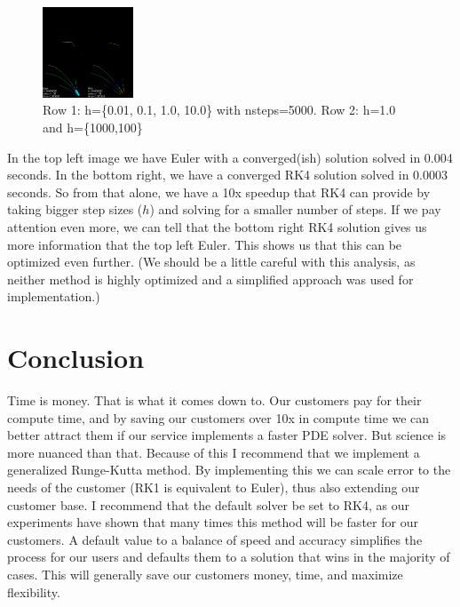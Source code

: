 \documentclass[12pt,letter]{article}
\begin{document}
\begin{figure}[ht]
\begin{center}
    \includegraphics[width=0.24\textwidth]{imgs/h10n100.png}
    \end{center}
    \caption{Row 1: h=\{0.01, 0.1, 1.0, 10.0\} with nsteps=5000. Row 2: h=1.0 and h=\{1000,100\}}
\end{figure}
\FloatBarrier

In the top left image we have Euler with a converged(ish) solution solved in
0.004 seconds. In the bottom right, we have a converged RK4 solution solved in
0.0003 seconds. So from that alone, we have a 10x speedup that RK4 can provide
by taking bigger step sizes ($h$) and solving for a smaller number of steps. If
we pay attention even more, we can tell that the bottom right RK4 solution gives 
us more information that the top left Euler. This shows us that this can be
optimized even further. (We should be a little careful with this analysis, as
neither method is highly optimized and a simplified approach was used for
implementation.)

\section{Conclusion} 

Time is money. That is what it comes down to. Our customers pay for their
compute time, and by saving our customers over 10x in compute time we can better
attract them if our service implements a faster PDE solver. But science is more
nuanced than that. Because of this I recommend that we implement a generalized
Runge-Kutta method. By implementing this we can scale error to the needs of the
customer (RK1 is equivalent to Euler), thus also extending our customer base.  I
recommend that the default solver be set to RK4, as our experiments have shown
that many times this method will be faster for our customers. A default value to
a balance of speed and accuracy simplifies the process for our users and
defaults them to a solution that wins in the majority of cases. This will
generally save our customers money, time, and maximize flexibility.
\end{document}
